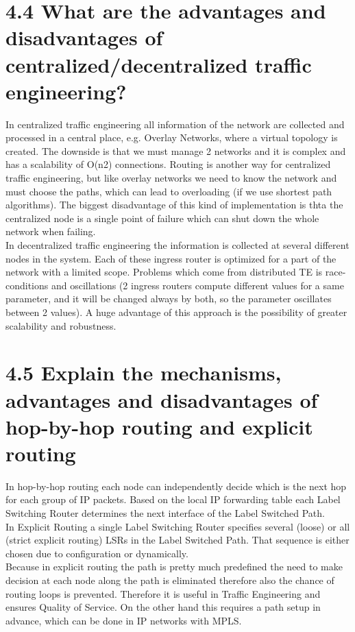 \documentclass{article}
\begin{document}
	\newpage
	
	\section*{4.4 What are the advantages and disadvantages of centralized/decentralized traffic engineering?}
	\begin{adjustwidth}{2em}{2em}
		In centralized traffic engineering all information of the network are collected and processed in a central place, e.g. Overlay Networks, where a virtual topology is created. The downside is that we must manage 2 networks and it is complex and has a scalability of O(n2) connections. Routing is another way for centralized traffic engineering, but like overlay networks we need to know the network and must choose the paths, which can lead to overloading (if we use shortest path algorithms). The biggest disadvantage of this kind of implementation is thta the centralized node is a single point of failure which can shut down the whole network when failing. \\
		In decentralized traffic engineering the information is collected at several different nodes in the system. Each of these ingress router is optimized for a part of the network with a limited scope. Problems which come from distributed TE is race-conditions and oscillations (2 ingress routers compute different values for a same parameter, and it will be changed always by both, so the parameter oscillates between 2 values). A huge advantage of this approach is the possibility of greater scalability and robustness.
	\end{adjustwidth}
	
	\section*{4.5 Explain the mechanisms, advantages and disadvantages of hop-by-hop routing and explicit routing}
	\begin{adjustwidth}{2em}{2em}
		In hop-by-hop routing each node can independently decide which is the next hop for each group of IP packets. Based on the local IP forwarding table each Label Switching Router determines the next interface of the Label Switched Path. \\
		In Explicit Routing a single Label Switching Router specifies several (loose) or all (strict explicit routing) LSRs in the Label Switched Path. That sequence is either chosen due to configuration or dynamically. \\
		Because in explicit routing the path is pretty much predefined the need to make decision at each node along the path is eliminated therefore also the chance of routing loops is prevented. Therefore it is useful in Traffic Engineering and ensures Quality of Service. On the other hand this requires a path setup in advance, which can be done in IP networks with MPLS.
	\end{adjustwidth}
	
\end{document}
